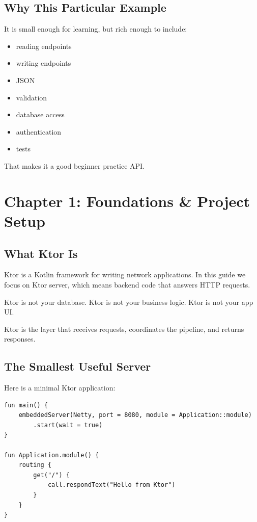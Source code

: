 \documentclass[11pt,a4paper]{article}
\begin{document}
\subsection{Why This Particular Example}

It is small enough for learning, but rich enough to include:
\begin{itemize}
    \item reading endpoints
    \item writing endpoints
    \item JSON
    \item validation
    \item database access
    \item authentication
    \item tests
\end{itemize}

That makes it a good beginner practice API.

\section{Chapter 1: Foundations \& Project Setup}

\subsection{What Ktor Is}

Ktor is a Kotlin framework for writing network applications. In this guide we focus on Ktor server, which means backend code that answers HTTP requests.

Ktor is not your database.
Ktor is not your business logic.
Ktor is not your app UI.

Ktor is the layer that receives requests, coordinates the pipeline, and returns responses.

\subsection{The Smallest Useful Server}

Here is a minimal Ktor application:

\begin{lstlisting}[style=kazekotlin]
fun main() {
    embeddedServer(Netty, port = 8080, module = Application::module)
        .start(wait = true)
}

fun Application.module() {
    routing {
        get("/") {
            call.respondText("Hello from Ktor")
        }
    }
}
\end{lstlisting}
\end{document}
